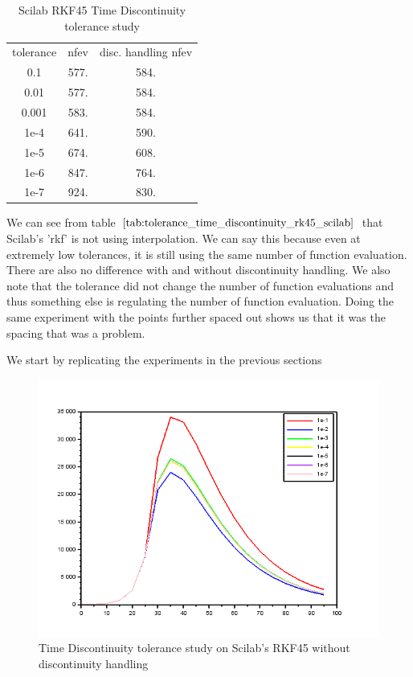 \begin{table}[h]
\caption {Scilab RKF45 Time Discontinuity tolerance study} 
\label{tab:tolerance_time_discontinuity_rk45_scilab} 
\begin{center}
\begin{tabular}{ c c c }
tolerance & nfev  & disc. handling nfev \\ 
    0.1  & 577.  & 584. \\
    0.01  & 577. & 584. \\
    0.001  & 583. &  584. \\
    1e-4  & 641.  &  590. \\
    1e-5  & 674.  &  608. \\
    1e-6 &  847.  &  764. \\
    1e-7  & 924.  & 830.   \\
\end{tabular}
\end{center}
\end{table}
We can see from table $\ref{tab:tolerance_time_discontinuity_rk45_scilab}$ that Scilab's 'rkf' is not using interpolation. We can say this because even at extremely low tolerances, it is still using the same number of function evaluation. There are also no difference with and without discontinuity handling. We also note that the tolerance did not change the number of function evaluations and thus something else is regulating the number of function evaluation. Doing the same experiment with the points further spaced out shows us that it was the spacing that was a problem.

We start by replicating the experiments in the previous sections
\begin{figure}[h]
	\centering
	\includegraphics[width=0.7\linewidth]{./figures/tolerance_time_rkf_further_no_event_sci}
	\caption{Time Discontinuity tolerance study on Scilab's RKF45 without discontinuity handling}
	\label{fig:tolerance_time_rkf_further_no_event_sci}
\end{figure}

